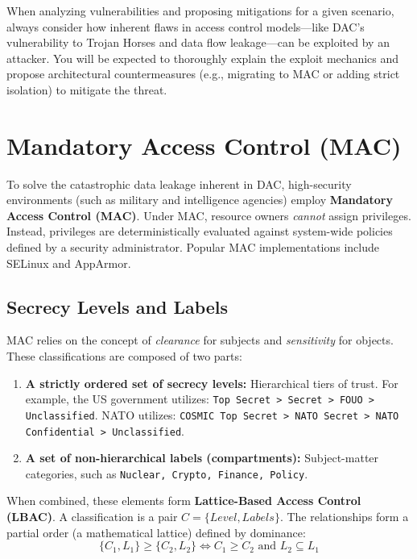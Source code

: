 \begin{tcolorbox}[colback=blue!5!white,colframe=blue!75!black,title=Exam Insight]
When analyzing vulnerabilities and proposing mitigations for a given scenario, always consider how inherent flaws in access control models—like DAC's vulnerability to Trojan Horses and data flow leakage—can be exploited by an attacker. You will be expected to thoroughly explain the exploit mechanics and propose architectural countermeasures (e.g., migrating to MAC or adding strict isolation) to mitigate the threat.
\end{tcolorbox}

\section{Mandatory Access Control (MAC)}
To solve the catastrophic data leakage inherent in DAC, high-security environments (such as military and intelligence agencies) employ \textbf{Mandatory Access Control (MAC)}. Under MAC, resource owners \textit{cannot} assign privileges. Instead, privileges are deterministically evaluated against system-wide policies defined by a security administrator. Popular MAC implementations include SELinux and AppArmor.

\subsection{Secrecy Levels and Labels}
MAC relies on the concept of \textit{clearance} for subjects and \textit{sensitivity} for objects. These classifications are composed of two parts:
\begin{enumerate}
    \item \textbf{A strictly ordered set of secrecy levels:} Hierarchical tiers of trust. For example, the US government utilizes: \texttt{Top Secret > Secret > FOUO > Unclassified}. NATO utilizes: \texttt{COSMIC Top Secret > NATO Secret > NATO Confidential > Unclassified}.
    \item \textbf{A set of non-hierarchical labels (compartments):} Subject-matter categories, such as \texttt{Nuclear, Crypto, Finance, Policy}.
\end{enumerate}

When combined, these elements form \textbf{Lattice-Based Access Control (LBAC)}. A classification is a pair $C = \{Level, Labels\}$. The relationships form a partial order (a mathematical lattice) defined by dominance:
\[ \{C_1, L_1\} \ge \{C_2, L_2\} \iff C_1 \ge C_2 \text{ and } L_2 \subseteq L_1 \]

